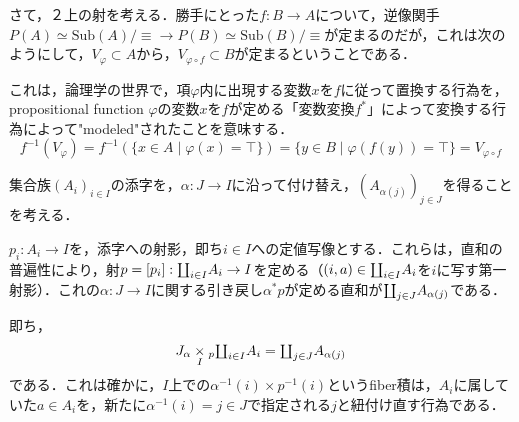 \documentclass[uplatex, 12pt, dvipdfmx]{jsarticle}
\begin{document}
\begin{example}
    さて，２上の射を考える．勝手にとった$f:B\to A$について，逆像関手$P(A)\simeq\mathrm{Sub}(A)/\equiv\to P(B)\simeq\mathrm{Sub}(B)/\equiv$が定まるのだが，これは次のようにして，$V_\varphi\subset A$から，$V_{\varphi\circ f}\subset B$が定まるということである．
    \begin{center}
    \end{center}
    これは，論理学の世界で，項$\varphi$内に出現する変数$x$を$f$に従って置換する行為を，propositional function $\varphi$の変数$x$を$f$が定める「変数変換$f^*$」によって変換する行為によって"modeled"されたことを意味する．
    \[ f^{-1}(V_\varphi) = f^{-1}(\{ x\in A\mid \varphi(x)=\top \}) = \{y\in B\mid \varphi(f(y))=\top\} = V_{\varphi\circ f} \]
\end{example}

\begin{example}[集合族に対する座標変換]
    集合族$(A_i)_{i\in I}$の添字を，$\alpha:J\to I$に沿って付け替え，$(A_{\alpha(j)})_{j\in J}$を得ることを考える．

    $p_i:A_i\to I$を，添字への射影，即ち$i\in I$への定値写像とする．これらは，直和の普遍性により，射$p=[p_i]:\rotatebox[origin=c]{180}{$\prod$}_{i\in I}A_i\to I$を定める（$(i,a)\in\rotatebox[origin=c]{180}{$\prod$}_{i\in I}A_i$を$i$に写す第一射影）．これの$\alpha:J\to I$に関する引き戻し$\alpha^*p$が定める直和が$\rotatebox[origin=c]{180}{$\prod$}_{j\in J}A_{\alpha(j)}$である．
    \begin{center}
    \end{center}
    即ち，
    \[ J_\alpha\underset{I}{\times}{}_p\rotatebox[origin=c]{180}{$\prod$}_{i\in I}A_i = \rotatebox[origin=c]{180}{$\prod$}_{j\in J}A_{\alpha(j)} \]
    である．これは確かに，$I$上での$\alpha^{-1}(i)\times p^{-1}(i)$というfiber積は，$A_i$に属していた$a\in A_i$を，新たに$\alpha^{-1}(i)=j\in J$で指定される$j$と紐付け直す行為である．
\end{example}
\end{document}
